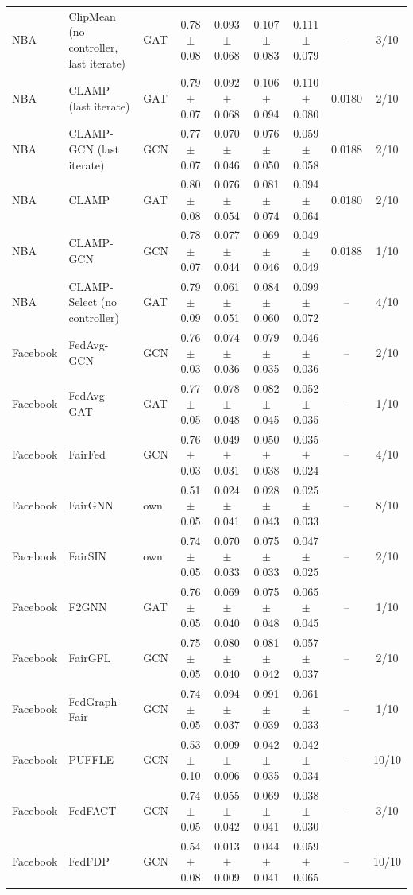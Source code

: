 \begin{longtable}{lp{3.2cm}lcccccc}
NBA & ClipMean (no controller, last iterate) & GAT & 0.78$\pm$0.08 & 0.093$\pm$0.068 & 0.107$\pm$0.083 & 0.111$\pm$0.079 & -- & 3/10 \\
NBA & CLAMP (last iterate) & GAT & 0.79$\pm$0.07 & 0.092$\pm$0.068 & 0.106$\pm$0.094 & 0.110$\pm$0.080 & 0.0180 & 2/10 \\
NBA & CLAMP-GCN (last iterate) & GCN & 0.77$\pm$0.07 & 0.070$\pm$0.046 & 0.076$\pm$0.050 & 0.059$\pm$0.058 & 0.0188 & 2/10 \\
NBA & CLAMP & GAT & 0.80$\pm$0.08 & 0.076$\pm$0.054 & 0.081$\pm$0.074 & 0.094$\pm$0.064 & 0.0180 & 2/10 \\
NBA & CLAMP-GCN & GCN & 0.78$\pm$0.07 & 0.077$\pm$0.044 & 0.069$\pm$0.046 & 0.049$\pm$0.049 & 0.0188 & 1/10 \\
NBA & CLAMP-Select (no controller) & GAT & 0.79$\pm$0.09 & 0.061$\pm$0.051 & 0.084$\pm$0.060 & 0.099$\pm$0.072 & -- & 4/10 \\
Facebook & FedAvg-GCN & GCN & 0.76$\pm$0.03 & 0.074$\pm$0.036 & 0.079$\pm$0.035 & 0.046$\pm$0.036 & -- & 2/10 \\
Facebook & FedAvg-GAT & GAT & 0.77$\pm$0.05 & 0.078$\pm$0.048 & 0.082$\pm$0.045 & 0.052$\pm$0.035 & -- & 1/10 \\
Facebook & FairFed & GCN & 0.76$\pm$0.03 & 0.049$\pm$0.031 & 0.050$\pm$0.038 & 0.035$\pm$0.024 & -- & 4/10 \\
Facebook & FairGNN & own & 0.51$\pm$0.05 & 0.024$\pm$0.041 & 0.028$\pm$0.043 & 0.025$\pm$0.033 & -- & 8/10 \\
Facebook & FairSIN & own & 0.74$\pm$0.05 & 0.070$\pm$0.033 & 0.075$\pm$0.033 & 0.047$\pm$0.025 & -- & 2/10 \\
Facebook & F2GNN & GAT & 0.76$\pm$0.05 & 0.069$\pm$0.040 & 0.075$\pm$0.048 & 0.065$\pm$0.045 & -- & 1/10 \\
Facebook & FairGFL & GCN & 0.75$\pm$0.05 & 0.080$\pm$0.040 & 0.081$\pm$0.042 & 0.057$\pm$0.037 & -- & 2/10 \\
Facebook & FedGraph-Fair & GCN & 0.74$\pm$0.05 & 0.094$\pm$0.037 & 0.091$\pm$0.039 & 0.061$\pm$0.033 & -- & 1/10 \\
Facebook & PUFFLE & GCN & 0.53$\pm$0.10 & 0.009$\pm$0.006 & 0.042$\pm$0.035 & 0.042$\pm$0.034 & -- & 10/10 \\
Facebook & FedFACT & GCN & 0.74$\pm$0.05 & 0.055$\pm$0.042 & 0.069$\pm$0.041 & 0.038$\pm$0.030 & -- & 3/10 \\
Facebook & FedFDP & GCN & 0.54$\pm$0.08 & 0.013$\pm$0.009 & 0.044$\pm$0.041 & 0.059$\pm$0.065 & -- & 10/10 \\

\end{longtable}
